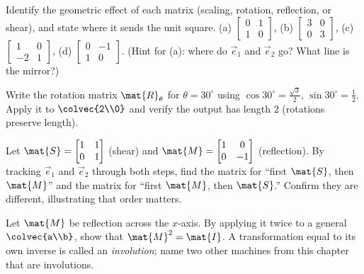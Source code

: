 \begin{exercise}
\label{ch05:ex-name}
Identify the geometric effect of each matrix (scaling, rotation, reflection, or
shear), and state where it sends the unit square.
(a) $\begin{bmatrix} 0 & 1 \\ 1 & 0\end{bmatrix}$,
(b) $\begin{bmatrix} 3 & 0 \\ 0 & 3\end{bmatrix}$,
(c) $\begin{bmatrix} 1 & 0 \\ -2 & 1\end{bmatrix}$,
(d) $\begin{bmatrix} 0 & -1 \\ 1 & 0\end{bmatrix}$.
(Hint for (a): where do $\vec{e}_1$ and $\vec{e}_2$ go? What line is the mirror?)
\end{exercise}

\begin{exercise}
\label{ch05:ex-rotation}
Write the rotation matrix $\mat{R}_{\theta}$ for $\theta = 30^\circ$ using
$\cos 30^\circ = \tfrac{\sqrt 3}{2}$, $\sin 30^\circ = \tfrac12$. Apply it to
$\colvec{2\\0}$ and verify the output has length $2$ (rotations preserve length).
\end{exercise}

\begin{exercise}
\label{ch05:ex-compose}
Let $\mat{S} = \begin{bmatrix} 1 & 1 \\ 0 & 1\end{bmatrix}$ (shear) and
$\mat{M} = \begin{bmatrix} 1 & 0 \\ 0 & -1\end{bmatrix}$ (reflection). By tracking
$\vec{e}_1$ and $\vec{e}_2$ through both steps, find the matrix for ``first
$\mat{S}$, then $\mat{M}$'' and the matrix for ``first $\mat{M}$, then $\mat{S}$.''
Confirm they are different, illustrating that order matters.
\end{exercise}

\begin{exercise}
\label{ch05:ex-involution}
Let $\mat{M}$ be reflection across the $x$-axis. By applying it twice to a general
$\colvec{a\\b}$, show that $\mat{M}^2 = \mat{I}$. A transformation equal to its own
inverse is called an \emph{involution}; name two other machines from this chapter
that are involutions.
\end{exercise}

